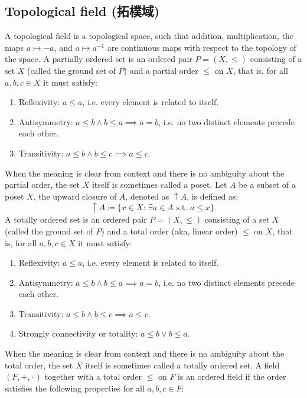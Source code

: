\documentclass[a4paper,12pt]{article}
\begin{document}
\subsection{Topological field (拓樸域)}
A topological field is a topological space, such that addition, multiplication, the maps $a\mapsto -a$, and $a\mapsto a^{-1}$ are continuous maps with respect to the topology of the space.
A partially ordered set is an ordered pair $P=(X,\leq )$ consisting of a set $X$ (called the ground set of $P$) and a partial order $\leq$ on $X$, that is, for all $a,b,c\in X$ it must satisfy:
\begin{enumerate}
\item Reflexivity: $a\leq a$, i.e. every element is related to itself.
\item Antisymmetry: $a\leq b\land b\leq a\implies a=b$, i.e. no two distinct elements precede each other.
\item Transitivity: $a\leq b\land b\leq c\implies a\leq c$.
\end{enumerate}
When the meaning is clear from context and there is no ambiguity about the partial order, the set $X$ itself is sometimes called a poset.
Let $A$ be a subset of a poset $X$, the upward closure of $A$, denoted as $\uparrow A$, is defined as:
\[\uparrow A \coloneq \{ x \in X : \,\exists a \in A \text{ s.t. } a \leq x \}.\]
A totally ordered set is an ordered pair $P=(X,\leq )$ consisting of a set $X$ (called the ground set of $P$) and a total order (aka, linear order) $\leq$ on $X$, that is, for all $a,b,c\in X$ it must satisfy:
\begin{enumerate}
\item Reflexivity: $a\leq a$, i.e. every element is related to itself.
\item Antisymmetry: $a\leq b\land b\leq a\implies a=b$, i.e. no two distinct elements precede each other.
\item Transitivity: $a\leq b\land b\leq c\implies a\leq c$.
\item Strongly connectivity or totality: $a\leq b\lor b\leq a$.
\end{enumerate}
When the meaning is clear from context and there is no ambiguity about the total order, the set $X$ itself is sometimes called a totally ordered set.
A field $(F,+,\cdot\,)$ together with a total order $\leq$ on $F$ is an ordered field if the order satisfies the following properties for all $a,b,c\in F$:
\end{document}
